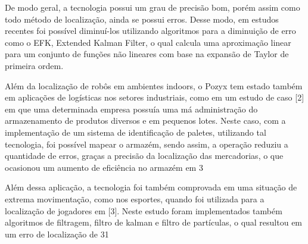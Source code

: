 De modo geral, a tecnologia possui um grau de precisão bom, porém assim como todo método de localização, ainda se possui erros. Desse modo, em estudos recentes foi possível diminuí-los utilizando algoritmos para a diminuição de erro como o EFK, Extended Kalman Filter, \cite{Tres} o qual calcula uma aproximação linear para um conjunto de funções não lineares com base na expansão de Taylor de primeira ordem.

Além da localização de robôs em ambientes indoors, o Pozyx tem estado também em aplicações de logísticas nos setores industriais, como em um estudo de caso [2] em que uma determinada empresa possuía uma má administração do  armazenamento de produtos diversos e em pequenos lotes. Neste caso, com a implementação de um sistema de identificação de paletes, utilizando tal tecnologia, foi possível mapear o armazém, sendo assim, a operação reduziu a quantidade de erros, graças a precisão da localização das mercadorias, o que ocasionou um aumento de eficiência no armazém em 3%

Além dessa aplicação, a tecnologia foi também comprovada em uma situação de extrema movimentação, como nos esportes, quando foi utilizada para a localização de jogadores em [3]. Neste estudo foram implementados também algoritmos de filtragem, filtro de kalman e filtro de partículas, o qual resultou em um erro de localização de 31%




